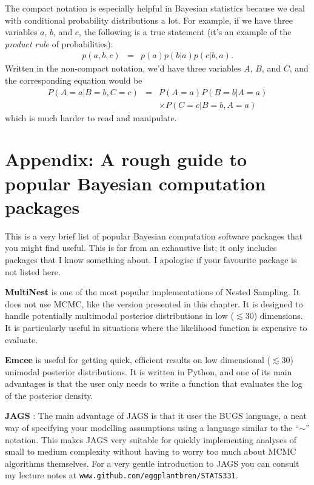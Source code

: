 The compact notation is especially helpful in Bayesian statistics because
we deal with conditional probability distributions a lot. For example, if we
have three variables $a$, $b$, and $c$, the following is a true statement
(it's an example of the {\it product rule} of probabilities):
\begin{eqnarray}
p(a, b, c) &=& p(a)p(b|a)p(c|b,a).
\end{eqnarray}
Written in the non-compact notation, we'd have three variables $A$, $B$, and
$C$, and the corresponding equation would be
\begin{eqnarray}
P(A=a | B=b, C=c) &=&
 P(A=a)P(B=b|A=a)\\
& & \times P(C=c|B=b,A=a)
\end{eqnarray}
which is much harder to read and manipulate.

\section{Appendix: A rough guide to popular Bayesian computation packages}
This is a very brief list of popular Bayesian computation software packages
that you might find useful. This is far from an exhaustive list; it only
includes packages that I know something about. I apologise if your favourite
package is not listed here.

{\bf MultiNest} \citep{multinest} is one of the most popular implementations of
Nested Sampling. It does not use MCMC, like the version presented in this
chapter. It is designed to handle potentially multimodal posterior
distributions in low ($\lesssim 30$) dimensions. It is particularly useful in
situations where the likelihood function is expensive to evaluate.

{\bf Emcee} \citep{emcee} is useful for getting quick, efficient results on low
dimensional ($\lesssim 30$) unimodal posterior distributions.
It is written in Python, and one of its main advantages is that the user only
needs to write a function that evaluates the log of the posterior density.

{\bf JAGS} \citep{jags}: The main advantage of JAGS is that it
uses the BUGS language, a neat way of specifying your modelling assumptions
using a language similar to the ``$\sim$'' notation. This makes JAGS very
suitable for quickly implementing analyses of small to medium complexity without
having to worry too much about MCMC algorithms themselves. For a very gentle
introduction to JAGS you can consult my lecture notes at
{\tt www.github.com/eggplantbren/STATS331}.

